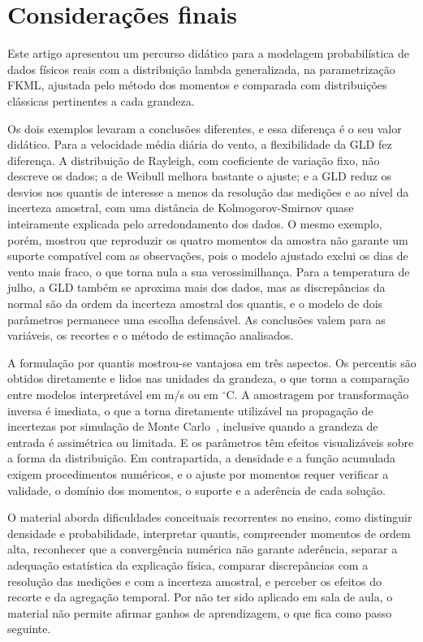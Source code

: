 \section{Considerações finais}\label{sec:consideracoes}

Este artigo apresentou um percurso didático para a modelagem probabilística de dados físicos reais com a distribuição lambda generalizada, na parametrização FKML, ajustada pelo método dos momentos e comparada com distribuições clássicas pertinentes a cada grandeza.

Os dois exemplos levaram a conclusões diferentes, e essa diferença é o seu valor didático. Para a velocidade média diária do vento, a flexibilidade da GLD fez diferença. A distribuição de Rayleigh, com coeficiente de variação fixo, não descreve os dados; a de Weibull melhora bastante o ajuste; e a GLD reduz os desvios nos quantis de interesse a menos da resolução das medições e ao nível da incerteza amostral, com uma distância de Kolmogorov-Smirnov quase inteiramente explicada pelo arredondamento dos dados. O mesmo exemplo, porém, mostrou que reproduzir os quatro momentos da amostra não garante um suporte compatível com as observações, pois o modelo ajustado exclui os dias de vento mais fraco, o que torna nula a sua verossimilhança. Para a temperatura de julho, a GLD também se aproxima mais dos dados, mas as discrepâncias da normal são da ordem da incerteza amostral dos quantis, e o modelo de dois parâmetros permanece uma escolha defensável. As conclusões valem para as variáveis, os recortes e o método de estimação analisados.

A formulação por quantis mostrou-se vantajosa em três aspectos. Os percentis são obtidos diretamente e lidos nas unidades da grandeza, o que torna a comparação entre modelos interpretável em m/s ou em $^\circ$C. A amostragem por transformação inversa é imediata, o que a torna diretamente utilizável na propagação de incertezas por simulação de Monte Carlo~\cite{gums1}, inclusive quando a grandeza de entrada é assimétrica ou limitada. E os parâmetros têm efeitos visualizáveis sobre a forma da distribuição. Em contrapartida, a densidade e a função acumulada exigem procedimentos numéricos, e o ajuste por momentos requer verificar a validade, o domínio dos momentos, o suporte e a aderência de cada solução.

O material aborda dificuldades conceituais recorrentes no ensino, como distinguir densidade e probabilidade, interpretar quantis, compreender momentos de ordem alta, reconhecer que a convergência numérica não garante aderência, separar a adequação estatística da explicação física, comparar discrepâncias com a resolução das medições e com a incerteza amostral, e perceber os efeitos do recorte e da agregação temporal. Por não ter sido aplicado em sala de aula, o material não permite afirmar ganhos de aprendizagem, o que fica como passo seguinte.

